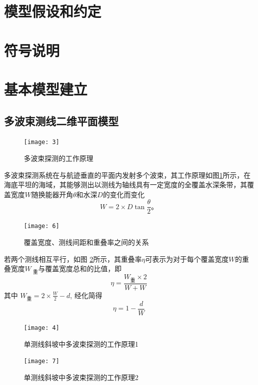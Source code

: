 \documentclass[11pt,twoside,a4paper]{article}
\begin{document}
	\section{模型假设和约定}
	
	\section{符号说明}
	
	\section{基本模型建立}
\subsection{多波束测线二维平面模型}
	\begin{figure}[htbp]
		\centering
		\texttt{[image: 3]}
		\caption{多波束探测的工作原理}
		\label{1}
	\end{figure}
	
	多波束探测系统在与航迹垂直的平面内发射多个波束，其工作原理如图\ref{1}所示，在海底平坦的海域，其能够测出以测线为轴线具有一定宽度的全覆盖水深条带，其覆盖宽度$W$随换能器开角$\theta$和水深$D$的变化而变化
	\begin{equation}
		W=2 \times D \tan{\frac{\theta}{2}} \text{。}
	\end{equation}	
	\begin{figure}[h]
		\centering
		\texttt{[image: 6]}
		\caption{覆盖宽度、测线间距和重叠率之间的关系}
		\label{3}	
	\end{figure}

若两个测线相互平行，如图 \ref{3}所示，其重叠率$\eta$可表示为对于每个覆盖宽度$W$的重叠宽度$W_\text{ 重}$与覆盖宽度总和的比值，即
	\begin{equation}
	\eta=\frac{W_\text{重} \times 2}{W+W}
	\label{eq2}
    \end{equation}
其中 $W_\text{重}=2\times\frac{W}{2}-d$,
经化简得
	\begin{equation}
	\eta=1-\frac{d}{W}
   \end{equation}



\begin{figure}[h]
	\centering
	\texttt{[image: 4]}
	\caption{单测线斜坡中多波束探测的工作原理1}
	\label{2}
\end{figure}

 \begin{figure}[h]
	\centering
	\texttt{[image: 7]}
	\caption{单测线斜坡中多波束探测的工作原理2}
	\label{5}
\end{figure}
\end{document}
